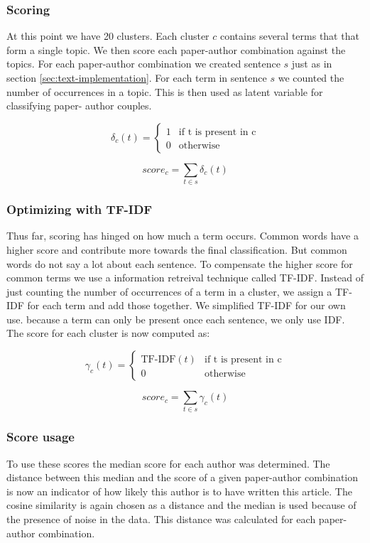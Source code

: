 \subsubsection{Scoring}

At this point we have 20 clusters. Each cluster $c$ contains several terms that that form a single topic. We then score each paper-author combination against the topics. For each  paper-author combination we created sentence $s$ just as in section \ref{sec:text-implementation}. For each term in sentence $s$ we counted the number of occurrences in a topic. This is then used as latent variable for classifying paper-
author couples.

\begin{multicols}{2}
\[ \delta_c(t) =\left\{ \begin{matrix} 1 & \mbox{if t is present in c} \\ 0 & \mbox{otherwise} \end{matrix} \right.\]

\[ score_c = \sum_{t \in s} \delta_c(t) \]
\end{multicols}

\subsubsection{Optimizing with TF-IDF}

Thus far, scoring has hinged on how much a term occurs. Common words have a higher score and contribute more towards the final classification. But common words do not say a lot about each sentence\cite{chowdhury2010introduction}. To compensate the higher score for common terms we use a information retreival technique called TF-IDF. Instead of just counting the number of occurrences of a term in a cluster, we assign a TF-IDF for each term and add those together. We simplified TF-IDF for our own use. because a term can only be present once each sentence, we only use IDF. The score for each cluster is now computed as:


\begin{multicols}{2}
\[ \gamma_c(t) =\left\{ \begin{matrix} \mbox{TF-IDF}(t) & \mbox{if t is present in c} \\ 0 & \mbox{otherwise} \end{matrix} \right.\]


\[ score_c = \sum_{t \in s} \gamma_c(t) \]
\end{multicols}

\subsubsection{Score usage}

To use these scores the median score for each author was determined. The distance between this median and the score of a given paper-author combination is now an indicator of how likely this author is to have written this article. The cosine similarity is again chosen as a distance and the median is used because of the presence of noise in the data. This distance was calculated for each paper-author combination.



